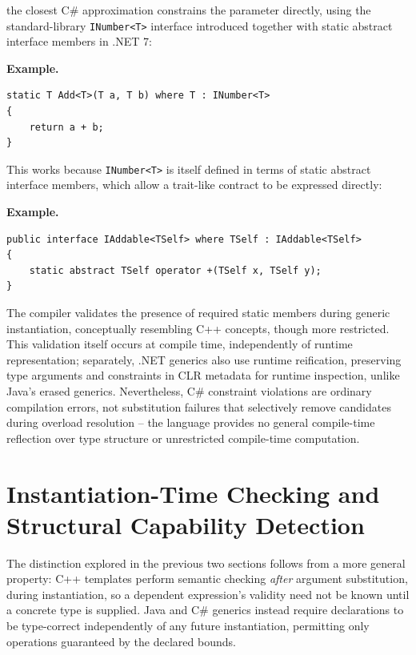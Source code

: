 \documentclass[11pt]{report}
\begin{document}
the closest C\# approximation constrains the parameter directly, using the
standard-library \texttt{INumber<T>} interface introduced together with
static abstract interface members in .NET 7:

\begin{examplebox}
\textbf{Example.}

\begin{lstlisting}[language=CSharp]
static T Add<T>(T a, T b) where T : INumber<T>
{
    return a + b;
}
\end{lstlisting}
\end{examplebox}

This works because \texttt{INumber<T>} is itself defined in terms of static
abstract interface members, which allow a trait-like contract to be
expressed directly:

\begin{examplebox}
\textbf{Example.}

\begin{lstlisting}[language=CSharp]
public interface IAddable<TSelf> where TSelf : IAddable<TSelf>
{
    static abstract TSelf operator +(TSelf x, TSelf y);
}
\end{lstlisting}
\end{examplebox}

The compiler validates the presence of required static members during
generic instantiation, conceptually resembling C++ concepts, though more
restricted. This validation itself occurs at compile time, independently
of runtime representation; separately, .NET generics also use runtime
reification, preserving type arguments and constraints in CLR metadata
for runtime inspection, unlike Java's erased generics. Nevertheless, C\#
constraint violations are ordinary compilation errors, not substitution
failures that selectively remove candidates during overload resolution --
the language provides no general compile-time reflection over type
structure or unrestricted compile-time computation.


\section{Instantiation-Time Checking and Structural Capability Detection}
\label{Metaprogramming:InstantiationTimeChecking}

The distinction explored in the previous two sections follows from a more
general property: C++ templates perform semantic checking \emph{after}
argument substitution, during instantiation, so a dependent expression's
validity need not be known until a concrete type is supplied. Java and C\#
generics instead require declarations to be type-correct independently of
any future instantiation, permitting only operations guaranteed by the
declared bounds.
\end{document}
